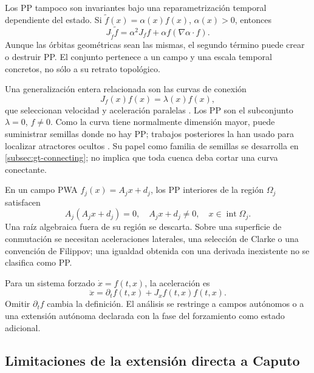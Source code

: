 Los PP tampoco son invariantes bajo una reparametrización temporal dependiente
del estado. Si \(\widetilde f(x)=\alpha(x)f(x)\), \(\alpha(x)>0\), entonces
\begin{equation}
 J_{\widetilde f}\widetilde f
 =\alpha^2J_f f+\alpha f(\nabla\alpha\cdot f).
 \label{eq:pp-time-rescaling}
\end{equation}
Aunque las órbitas geométricas sean las mismas, el segundo término puede crear
o destruir PP. El conjunto pertenece a un campo y una escala temporal
concretos, no sólo a su retrato topológico.

Una generalización entera relacionada son las curvas de conexión
\begin{equation}
 J_f(x)f(x)=\lambda(x)f(x),
 \label{eq:pp-connecting-curves}
\end{equation}
que seleccionan velocidad y aceleración paralelas
\cite{GilmoreEtAl2010Connecting}. Los PP son el subconjunto
\(\lambda=0\), \(f\neq0\). Como la curva tiene normalmente dimensión mayor,
puede suministrar semillas donde no hay PP; trabajos posteriores la han usado
para localizar atractores ocultos \cite{GuanXie2021Connecting}. Su papel como
familia de semillas se desarrolla en \cref{subsec:gt-connecting}; no implica
que toda cuenca deba cortar una curva conectante.

En un campo PWA \(f_j(x)=A_jx+d_j\), los PP interiores de la región
\(\Omega_j\) satisfacen
\begin{equation}
 A_j(A_jx+d_j)=0,
 \quad A_jx+d_j\neq0,
 \quad x\in\operatorname{int}\Omega_j.
 \label{eq:pp-pwa-region}
\end{equation}
Una raíz algebraica fuera de su región se descarta. Sobre una superficie de
conmutación se necesitan aceleraciones laterales, una selección de Clarke o
una convención de Filippov; una igualdad obtenida con una derivada inexistente
no se clasifica como PP.

Para un sistema forzado \(\dot x=f(t,x)\), la aceleración es
\begin{equation}
 \ddot x=\partial_t f(t,x)+J_xf(t,x)f(t,x).
\end{equation}
Omitir \(\partial_t f\) cambia la definición. El análisis se restringe a
campos autónomos o a una extensión autónoma declarada con la fase del
forzamiento como estado adicional.

\subsection{Limitaciones de la extensión directa a Caputo}

